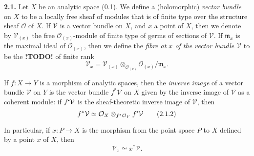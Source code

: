 \documentclass{report}
\newenvironment{rmenv}[1]
  {\phantomsection\par\medskip\noindent\textbf{#1.}\rmfamily}
  {\medskip}
\renewcommand{\cal}[1]{{\mathcal{#1}}}
\newcommand{\sbullet}{{\mathbin{\vcenter{\hbox{\scalebox{.5}{$\bullet$}}}}}}
\newcommand{\todo}{\textbf{ !TODO! }}
\newcommand{\oldpage}[1]{\marginpar{\footnotesize$\Big\vert$ \textit{p.~#1}}}
\begin{document}
\oldpage{5}

\begin{rmenv}{2.1}
  Let $X$ be an analytic space \hyperref[0.1]{(0.1)}.
  We define a (holomorphic) \emph{vector bundle} on $X$ to be a locally free sheaf of modules that is of finite type over the structure sheaf $\cal{O}$ of $X$.
  If $\cal{V}$ is a vector bundle on $X$, and $x$ a point of $X$, then we denote by $\cal{V}_{(x)}$ the free $\cal{O}_{(x)}$-module of finite type of germs of sections of $\cal{V}$.
  If $\mathfrak{m}_x$ is the maximal ideal of $\cal{O}_{(x)}$, then we define the \emph{fibre at $x$ of the vector bundle $\cal{V}$} to be the \todo of finite rank
  \[
  \label{I.2.1.1}
    \cal{V}_x = \cal{V}_{(x)} \otimes_{\cal{O}_{(x)}} \cal{O}_{(x)}/\mathfrak{m}_x.
  \tag{2.1.1}
  \]

  If $f\colon X\to Y$ is a morphism of analytic spaces, then the \emph{inverse image} of a vector bundle $\cal{V}$ on $Y$ is the vector bundle $f^*\cal{V}$ on $X$ given by the inverse image of $\cal{V}$ as a coherent module:
  if $f^\sbullet\cal{V}$ is the sheaf-theoretic inverse image of $\cal{V}$, then
  \[
  \label{I.2.1.2}
    f^*\cal{V} \simeq \cal{O}_X \otimes_{f^*\cal{O}_Y} f^\sbullet\cal{V}
  \tag{2.1.2}
  \]

  In particular, if $x\colon P\to X$ is the morphism from the point space $P$ to $X$ defined by a point $x$ of $X$, then
  \[
    \label{I.2.1.3}
      \cal{V}_x \simeq x^*\cal{V}.
    \tag{2.1.3}
  \]
\end{rmenv}
\end{document}
